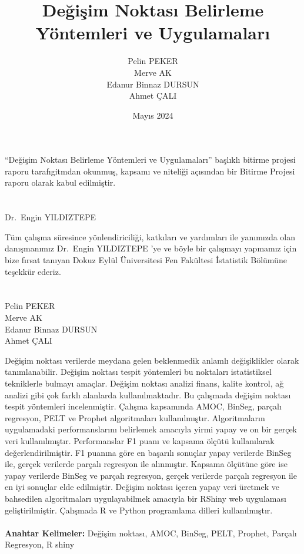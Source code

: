 \documentclass[12pt,twoside]{deuthesis}
\title{Değişim Noktası Belirleme Yöntemleri ve Uygulamaları}
\author{Pelin PEKER \\ Merve AK \\ Edanur Binnaz DURSUN \\ Ahmet ÇALI} %
\date{Mayıs 2024}
\begin{document}
  \maketitle

\frontmatter %
\pagestyle{empty} %

\begin{preface}
	``Değişim Noktası Belirleme Yöntemleri ve Uygulamaları'' başlıklı bitirme projesi raporu tarafıgitmdan okunmuş, kapsamı ve niteliği açısından bir Bitirme Projesi raporu olarak kabul edilmiştir.\\
~\\
~\\
Dr.~Engin YILDIZTEPE
\end{preface}

  \begin{acknowledgements}
    Tüm çalışma süresince yönlendiriciliği, katkıları ve yardımları ile yanımızda olan danışmanımız Dr.~Engin YILDIZTEPE 'ye ve böyle bir çalışmayı yapmamız için bize fırsat tanıyan Dokuz Eylül Üniversitesi Fen Fakültesi İstatistik Bölümüne teşekkür ederiz.\\
    ~\\
    ~\\
    Pelin PEKER\\
    Merve AK\\
    Edanur Binnaz DURSUN\\
    Ahmet ÇALI\\
  \end{acknowledgements}

\begin{abstractTR}
	Değişim noktası verilerde meydana gelen beklenmedik anlamlı değişiklikler olarak tanımlanabilir. Değişim noktası tespit yöntemleri bu noktaları istatistiksel tekniklerle bulmayı amaçlar. Değişim noktası analizi finans, kalite kontrol, ağ analizi gibi çok farklı alanlarda kullanılmaktadır. Bu çalışmada değişim noktası tespit yöntemleri incelenmiştir. Çalışma kapsamında AMOC, BinSeg, parçalı regresyon, PELT ve Prophet algoritmaları kullanılmıştır. Algoritmaların uygulamadaki performanslarını belirlemek amacıyla yirmi yapay ve on bir gerçek veri kullanılmıştır. Performanslar F1 puanı ve kapsama ölçütü kullanılarak değerlendirilmiştir. F1 puanına göre en başarılı sonuçlar yapay verilerde BinSeg ile, gerçek verilerde parçalı regresyon ile alınmıştır. Kapsama ölçütüne göre ise yapay verilerde BinSeg ve parçalı regresyon, gerçek verilerde parçalı regresyon ile en iyi sonuçlar elde edilmiştir. Değişim noktası içeren yapay veri üretmek ve bahsedilen algoritmaları uygulayabilmek amacıyla bir RShiny web uygulaması geliştirilmiştir. Çalışmada R ve Python programlama dilleri kullanılmıştır.\\
~\\

\textbf{Anahtar Kelimeler:} Değişim noktası, AMOC, BinSeg, PELT, Prophet, Parçalı Regresyon, R shiny
\end{abstractTR}
\end{document}
